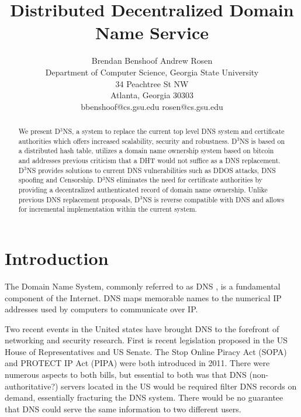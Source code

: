 \documentclass[11pt]{IEEEtran} %
\title{Distributed Decentralized Domain Name Service}
\author{
Brendan Benshoof \qquad Andrew Rosen  \\Department of Computer Science, Georgia State University\\ 34 Peachtree St NW \\ Atlanta, Georgia 30303\\  bbenshoof@cs.gsu.edu \qquad rosen@cs.gsu.edu }
\begin{document}
\maketitle

\begin{abstract}

We present D$^{3}$NS, a system to replace the current top level DNS system and certificate authorities which offers increased scalability, security and robustness. D$^{3}$NS is based on a distributed hash table, utilizes a domain name ownership system based on bitcoin and addresses previous criticism that a DHT would not suffice as a DNS replacement. D$^{3}$NS provides solutions to current DNS vulnerabilities such as DDOS attacks, DNS spoofing and Censorship. D$^{3}$NS eliminates the need for certificate authorities by providing a decentralized authenticated record of domain name ownership. Unlike previous DNS replacement proposals, D$^{3}$NS is reverse compatible with DNS and allows for incremental implementation within the current system.





\end{abstract}


\section{Introduction}
The Domain Name System, commonly referred to as DNS \cite{mockapetris2003rfc} \cite{mockapetris2004rfc}, is a fundamental component of the Internet.  DNS maps memorable names to the numerical IP addresses used by computers to communicate over IP. 

Two recent events in the United states have brought DNS to the forefront of networking and security research.  First is recent legislation proposed in the US House of Representatives and US Senate. The Stop Online Piracy Act (SOPA) \cite{sopa} and PROTECT IP Act (PIPA) \cite{pipa} were both introduced in 2011.  There were numerous aspects to both bills, but essential to both was that DNS (non-authoritative?) servers located in the US would be required filter DNS records on demand, essentially fracturing the DNS system.  There would be no guarantee that DNS could serve the same information to two different users.
\end{document}
